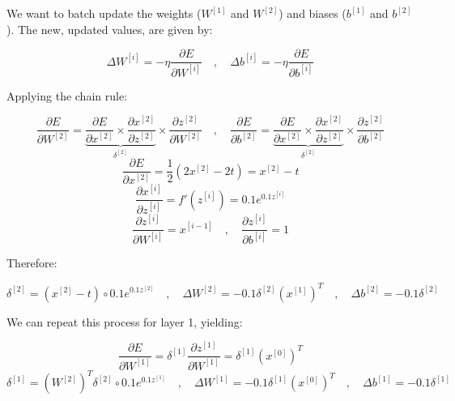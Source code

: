 \documentclass[12pt]{article}
\begin{document}
\begin{enumerate}[leftmargin=\labelsep]
          We want to batch update the weights ($W^{[1]}$ and $W^{[2]}$) and biases
          ($b^{[1]}$ and $b^{[2]}$). The new, updated values, are given by:

          $$
              \Delta W^{[i]} = - \eta \frac{\partial E}{\partial W^{[i]}}
              \quad,\quad
              \Delta b^{[i]} = - \eta \frac{\partial E}{\partial b^{[i]}}
          $$

          Applying the chain rule:

          $$
              \frac{\partial E}{\partial W^{[2]}} =
              \underbrace{\frac{\partial E}{\partial x^{[2]}}
                  \times
                  \frac{\partial x^{[2]}}{\partial z^{[2]}}
              }_{\delta^{[2]}}
              \times
              \frac{\partial z^{[2]}}{\partial W^{[2]}}
              \quad,\quad
              \frac{\partial E}{\partial b^{[2]}} =
              \underbrace{\frac{\partial E}{\partial x^{[2]}}
                  \times
                  \frac{\partial x^{[2]}}{\partial z^{[2]}}
              }_{\delta^{[2]}}
              \times
              \frac{\partial z^{[2]}}{\partial b^{[2]}}
          $$
          $$
              \frac{\partial E}{\partial x^{[2]}}
              = \frac{1}{2} \left( 2x^{[2]} - 2t \right)
              = x^{[2]} - t
          $$
          $$
              \frac{\partial x^{[i]}}{\partial z^{[i]}} = f'\left(z^{[i]}\right) = 0.1 e^{0.1 z^{[i]}}
          $$
          $$
              \frac{\partial z^{[i]}}{\partial W^{[i]}} = x^{[i-1]}
              \quad,\quad
              \frac{\partial z^{[i]}}{\partial b^{[i]}} = 1
          $$

          Therefore:

          \begin{equation}\label{ex3-vars-layer-2}
              \delta^{[2]} = (x^{[2]} - t) \circ 0.1 e^{0.1 z^{[2]}}
              \quad,\quad
              \Delta W^{[2]} = - 0.1 \delta^{[2]} \left(x^{[1]}\right)^T
              \quad,\quad
              \Delta b^{[2]} = - 0.1 \delta^{[2]}
          \end{equation}

          We can repeat this process for layer 1, yielding:

          $$
              \frac{\partial E}{\partial W^{[1]}} = \delta^{[1]} \frac{\partial z^{[1]}}{\partial W^{[1]}}
              = \delta^{[1]} \left(x^{[0]}\right)^T
          $$
          \begin{equation}\label{ex3-vars-layer-1}
              \delta^{[1]} = \left(W^{[2]}\right)^T \delta^{[2]} \circ 0.1 e^{0.1 z^{[1]}}
              \quad,\quad
              \Delta W^{[1]} = - 0.1 \delta^{[1]} \left(x^{[0]}\right)^T
              \quad,\quad
              \Delta b^{[1]} = - 0.1 \delta^{[1]}
          \end{equation}


\end{enumerate}
\end{document}
